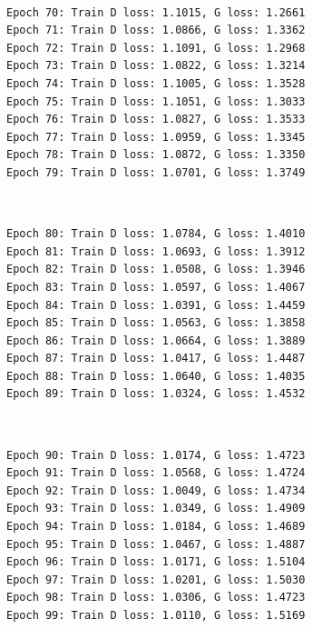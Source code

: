 \documentclass[11pt]{article}
\begin{document}
    \begin{center}
    \end{center}
    { \hspace*{\fill} \\}
    
    \begin{Verbatim}[commandchars=\\\{\}]
Epoch 70: Train D loss: 1.1015, G loss: 1.2661
Epoch 71: Train D loss: 1.0866, G loss: 1.3362
Epoch 72: Train D loss: 1.1091, G loss: 1.2968
Epoch 73: Train D loss: 1.0822, G loss: 1.3214
Epoch 74: Train D loss: 1.1005, G loss: 1.3528
Epoch 75: Train D loss: 1.1051, G loss: 1.3033
Epoch 76: Train D loss: 1.0827, G loss: 1.3533
Epoch 77: Train D loss: 1.0959, G loss: 1.3345
Epoch 78: Train D loss: 1.0872, G loss: 1.3350
Epoch 79: Train D loss: 1.0701, G loss: 1.3749

    \end{Verbatim}

    \begin{center}
    \end{center}
    { \hspace*{\fill} \\}
    
    \begin{Verbatim}[commandchars=\\\{\}]
Epoch 80: Train D loss: 1.0784, G loss: 1.4010
Epoch 81: Train D loss: 1.0693, G loss: 1.3912
Epoch 82: Train D loss: 1.0508, G loss: 1.3946
Epoch 83: Train D loss: 1.0597, G loss: 1.4067
Epoch 84: Train D loss: 1.0391, G loss: 1.4459
Epoch 85: Train D loss: 1.0563, G loss: 1.3858
Epoch 86: Train D loss: 1.0664, G loss: 1.3889
Epoch 87: Train D loss: 1.0417, G loss: 1.4487
Epoch 88: Train D loss: 1.0640, G loss: 1.4035
Epoch 89: Train D loss: 1.0324, G loss: 1.4532

    \end{Verbatim}

    \begin{center}
    \end{center}
    { \hspace*{\fill} \\}
    
    \begin{Verbatim}[commandchars=\\\{\}]
Epoch 90: Train D loss: 1.0174, G loss: 1.4723
Epoch 91: Train D loss: 1.0568, G loss: 1.4724
Epoch 92: Train D loss: 1.0049, G loss: 1.4734
Epoch 93: Train D loss: 1.0349, G loss: 1.4909
Epoch 94: Train D loss: 1.0184, G loss: 1.4689
Epoch 95: Train D loss: 1.0467, G loss: 1.4887
Epoch 96: Train D loss: 1.0171, G loss: 1.5104
Epoch 97: Train D loss: 1.0201, G loss: 1.5030
Epoch 98: Train D loss: 1.0306, G loss: 1.4723
Epoch 99: Train D loss: 1.0110, G loss: 1.5169

    \end{Verbatim}
\end{document}
